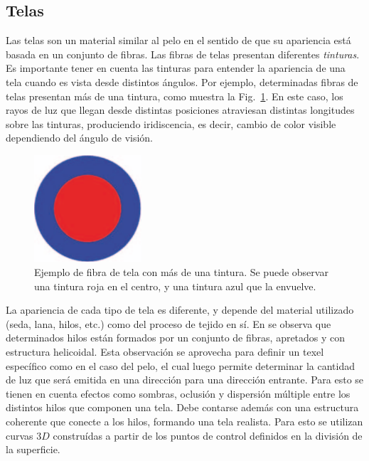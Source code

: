 \subsection{Telas}
Las telas son un material similar al pelo en el sentido de que su apariencia está basada en un conjunto de fibras.
Las fibras de telas presentan diferentes {\em tinturas}.
Es importante tener en cuenta las tinturas para entender la apariencia de una tela cuando es vista desde distintos ángulos.
Por ejemplo, determinadas fibras de telas presentan más de una tintura, como muestra la Fig.~\ref{fg:fibra}.
En este caso, los rayos de luz que llegan desde distintas posiciones atraviesan distintas longitudes sobre las tinturas, produciendo iridiscencia, es decir, cambio de color visible dependiendo del ángulo de visión.

\begin{figure}
\center
\includegraphics[width=4cm]{figures/fibra}
\caption[Ejemplo de fibra de tela con más de una tintura]{Ejemplo de fibra de tela con más de una tintura. Se puede observar una tintura roja en el centro, y una tintura azul que la envuelve.}
\label{fg:fibra}
\end{figure}

La apariencia de cada tipo de tela es diferente, y depende del material utilizado (seda, lana, hilos, etc.) como del proceso de tejido en sí.
En \cite{Xu2001} se observa que determinados hilos están formados por un conjunto de fibras, apretados y con estructura helicoidal.
Esta observación se aprovecha para definir un texel específico como en el caso del pelo, el cual luego permite determinar la cantidad de luz que será emitida en una dirección para una dirección entrante.
Para esto se tienen en cuenta efectos como sombras, oclusión y dispersión múltiple entre los distintos hilos que componen una tela.
Debe contarse además con una estructura coherente que conecte a los hilos, formando una tela realista.
Para esto se utilizan curvas $3D$ construídas a partir de los puntos de control definidos en la división de la superficie.


